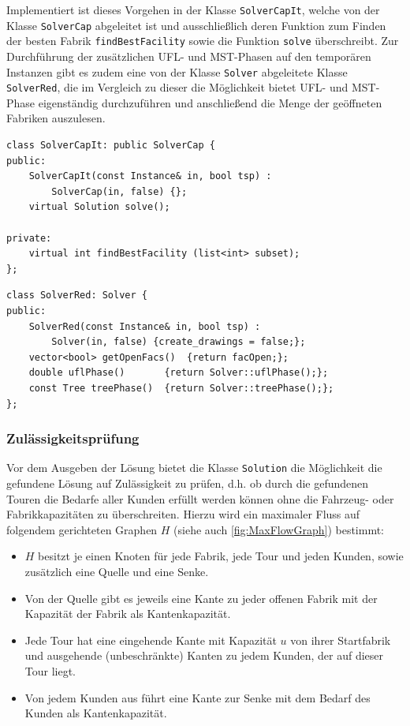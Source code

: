 \documentclass[a4paper,ngerman,11pt,bibtotoc]{scrartcl}
\theoremstyle{definition}
\theoremstyle{plain}
\theoremstyle{remark}
\newcommand{\MST}{MST}
\newcommand{\UFL}{UFL}
\begin{document}
	Implementiert ist dieses Vorgehen in der Klasse \lstinline|SolverCapIt|, welche von der Klasse \lstinline|SolverCap| abgeleitet ist und ausschließlich deren Funktion zum Finden der \glqq besten\grqq{} Fabrik \lstinline|findBestFacility| sowie die Funktion \lstinline|solve| überschreibt. Zur Durchführung der zusätzlichen \UFL- und \MST-Phasen auf den temporären Instanzen gibt es zudem eine von der Klasse \lstinline|Solver| abgeleitete Klasse \lstinline|SolverRed|, die im Vergleich zu dieser die Möglichkeit bietet \UFL- und \MST-Phase eigenständig durchzuführen und anschließend die Menge der geöffneten Fabriken auszulesen.

	\begin{lstlisting}[caption=Die Klasse SolverCapIt]
class SolverCapIt: public SolverCap {
public:
	SolverCapIt(const Instance& in, bool tsp) : 
		SolverCap(in, false) {};
	virtual Solution solve();

private:
	virtual int findBestFacility (list<int> subset);
};
	\end{lstlisting}	
	\begin{lstlisting}[caption=Die Klasse SolverRed]
class SolverRed: Solver {
public:
	SolverRed(const Instance& in, bool tsp) : 
		Solver(in, false) {create_drawings = false;};
	vector<bool> getOpenFacs() 	{return facOpen;};
	double uflPhase() 		{return Solver::uflPhase();};
	const Tree treePhase()	{return Solver::treePhase();};
};
	\end{lstlisting}
	
	\subsubsection{Zulässigkeitsprüfung}
	
	Vor dem Ausgeben der Lösung bietet die Klasse \lstinline|Solution| die Möglichkeit die gefundene Lösung auf Zulässigkeit zu prüfen, d.h. ob durch die gefundenen Touren die Bedarfe aller Kunden erfüllt werden können ohne die Fahrzeug- oder Fabrikkapazitäten zu überschreiten. Hierzu wird ein maximaler Fluss auf folgendem gerichteten Graphen $H$ (siehe auch \cref{fig:MaxFlowGraph}) bestimmt:
	\begin{itemize}
		\item $H$ besitzt je einen Knoten für jede Fabrik, jede Tour und jeden Kunden, sowie zusätzlich eine Quelle und eine Senke.
		\item Von der Quelle gibt es jeweils eine Kante zu jeder offenen Fabrik mit der Kapazität der Fabrik als Kantenkapazität.
		\item Jede Tour hat eine eingehende Kante mit Kapazität $u$ von ihrer Startfabrik und ausgehende (unbeschränkte) Kanten zu jedem Kunden, der auf dieser Tour liegt.
		\item Von jedem Kunden aus führt eine Kante zur Senke mit dem Bedarf des Kunden als Kantenkapazität.
	\end{itemize}
	
\end{document}
